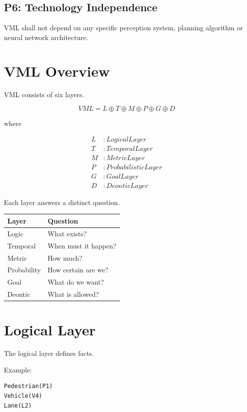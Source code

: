 \documentclass[11pt,a4paper]{article}
\begin{document}
\subsection{P6: Technology Independence}

VML shall not depend on any specific perception system,
planning algorithm or neural network architecture.

\section{VML Overview}

VML consists of six layers.

\[
VML
=
L
\oplus
T
\oplus
M
\oplus
P
\oplus
G
\oplus
D
\]

where

\begin{align}
L & : Logical Layer \\
T & : Temporal Layer \\
M & : Metric Layer \\
P & : Probabilistic Layer \\
G & : Goal Layer \\
D & : Deontic Layer
\end{align}

Each layer answers a distinct question.

\begin{center}
\begin{tabular}{ll}
Layer & Question \\
\hline
Logic & What exists? \\
Temporal & When must it happen? \\
Metric & How much? \\
Probability & How certain are we? \\
Goal & What do we want? \\
Deontic & What is allowed? \\
\end{tabular}
\end{center}

\section{Logical Layer}

The logical layer defines facts.

Example:

\begin{verbatim}
Pedestrian(P1)
Vehicle(V4)
Lane(L2)
\end{verbatim}
\end{document}
